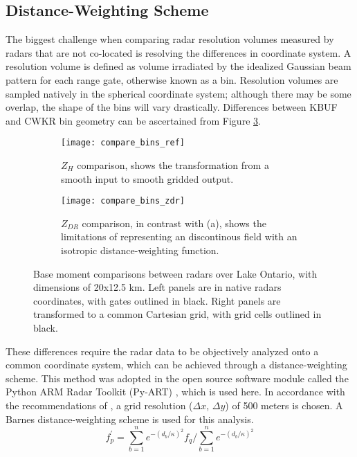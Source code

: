 \subsection{Distance-Weighting Scheme}
The biggest challenge when comparing radar resolution volumes measured by radars that are not co-located is resolving the differences in coordinate system. A resolution volume is defined as volume irradiated by the idealized Gaussian beam pattern for each range gate, otherwise known as a bin. Resolution volumes are sampled natively in the spherical coordinate system; although there may be some overlap, the shape of the bins will vary drastically. Differences between KBUF and CWKR bin geometry can be ascertained from Figure \ref{fig:compare_bins}. 
\begin{figure}[H]
\centering
   \begin{subfigure}{1.0\textwidth} \centering
     \texttt{[image: compare\_bins\_ref]}
     \caption{$Z_H$ comparison, shows the transformation from a smooth input to smooth gridded output.}\label{fig:compare_ref}
   \end{subfigure}
   \begin{subfigure}{1.0\textwidth} \centering
     \texttt{[image: compare\_bins\_zdr]}
     \caption{$Z_{DR}$ comparison, in contrast with (a), shows the limitations of representing an discontinous field with an isotropic distance-weighting function. }\label{fig:compare_zdr}
   \end{subfigure}
\caption{Base moment comparisons between radars over Lake Ontario, with dimensions of 20x12.5 km. Left panels are in native radars coordinates, with gates outlined in black. Right panels are transformed to a common Cartesian grid, with grid cells outlined in black.} \label{fig:compare_bins}
\end{figure}
These differences require the radar data to be objectively analyzed onto a common coordinate system, which can be achieved through a distance-weighting scheme. This method was adopted in the open source software module called the Python ARM Radar Toolkit (Py-ART) \citep{Py-ART}, which is used here. In accordance with the recommendations of \cite{Pauly1990}, a grid resolution ($\Delta x$, $\Delta y$) of 500 meters is chosen. A Barnes distance-weighting scheme is used for this analysis. 
\begin{equation}\label{eq:barnesdws}
f^{'}_{p} = \sum_{b=1}^n  e^{-(d_b/\kappa)^{2}} f_q  \bigg/ \sum_{b=1}^n e^{-(d_b/\kappa)^{2}}
\end{equation}
